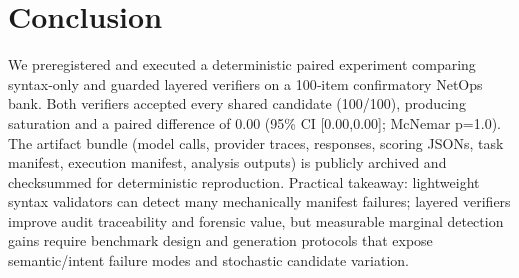 \documentclass[conference]{IEEEtran}
\begin{document}
\section{Conclusion}
We preregistered and executed a deterministic paired experiment comparing syntax-only and guarded layered verifiers on a 100‑item confirmatory NetOps bank. Both verifiers accepted every shared candidate (100/100), producing saturation and a paired difference of 0.00 (95\% CI [0.00,0.00]; McNemar p=1.0). The artifact bundle (model calls, provider traces, responses, scoring JSONs, task manifest, execution manifest, analysis outputs) is publicly archived and checksummed for deterministic reproduction. Practical takeaway: lightweight syntax validators can detect many mechanically manifest failures; layered verifiers improve audit traceability and forensic value, but measurable marginal detection gains require benchmark design and generation protocols that expose semantic/intent failure modes and stochastic candidate variation.
\end{document}

